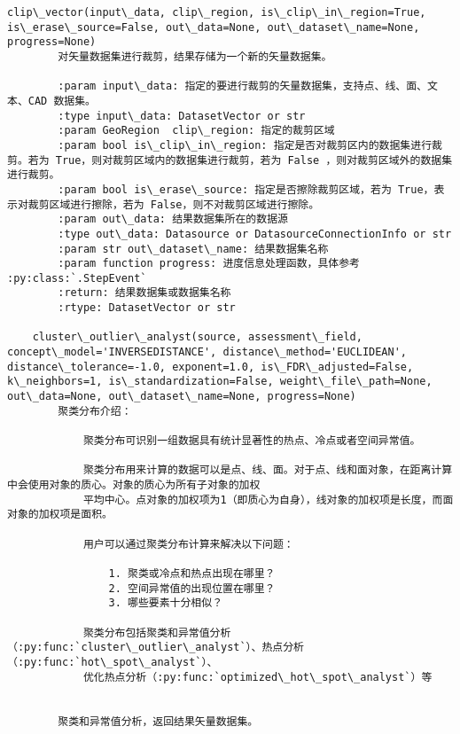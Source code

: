 \documentclass[11pt]{article}
\begin{document}
\begin{Verbatim}[commandchars=\\\{\}]
    clip\_vector(input\_data, clip\_region, is\_clip\_in\_region=True, is\_erase\_source=False, out\_data=None, out\_dataset\_name=None, progress=None)
        对矢量数据集进行裁剪，结果存储为一个新的矢量数据集。
        
        :param input\_data: 指定的要进行裁剪的矢量数据集，支持点、线、面、文本、CAD 数据集。
        :type input\_data: DatasetVector or str
        :param GeoRegion  clip\_region: 指定的裁剪区域
        :param bool is\_clip\_in\_region: 指定是否对裁剪区内的数据集进行裁剪。若为 True，则对裁剪区域内的数据集进行裁剪，若为 False ，则对裁剪区域外的数据集进行裁剪。
        :param bool is\_erase\_source: 指定是否擦除裁剪区域，若为 True，表示对裁剪区域进行擦除，若为 False，则不对裁剪区域进行擦除。
        :param out\_data: 结果数据集所在的数据源
        :type out\_data: Datasource or DatasourceConnectionInfo or str
        :param str out\_dataset\_name: 结果数据集名称
        :param function progress: 进度信息处理函数，具体参考 :py:class:`.StepEvent`
        :return: 结果数据集或数据集名称
        :rtype: DatasetVector or str
    
    cluster\_outlier\_analyst(source, assessment\_field, concept\_model='INVERSEDISTANCE', distance\_method='EUCLIDEAN', distance\_tolerance=-1.0, exponent=1.0, is\_FDR\_adjusted=False, k\_neighbors=1, is\_standardization=False, weight\_file\_path=None, out\_data=None, out\_dataset\_name=None, progress=None)
        聚类分布介绍：
        
            聚类分布可识别一组数据具有统计显著性的热点、冷点或者空间异常值。
        
            聚类分布用来计算的数据可以是点、线、面。对于点、线和面对象，在距离计算中会使用对象的质心。对象的质心为所有子对象的加权
            平均中心。点对象的加权项为1（即质心为自身），线对象的加权项是长度，而面对象的加权项是面积。
        
            用户可以通过聚类分布计算来解决以下问题：
        
                1. 聚类或冷点和热点出现在哪里？
                2. 空间异常值的出现位置在哪里？
                3. 哪些要素十分相似？
        
            聚类分布包括聚类和异常值分析（:py:func:`cluster\_outlier\_analyst`）、热点分析（:py:func:`hot\_spot\_analyst`）、
            优化热点分析（:py:func:`optimized\_hot\_spot\_analyst`）等
        
        
        聚类和异常值分析，返回结果矢量数据集。
        

\end{Verbatim}
\end{document}

